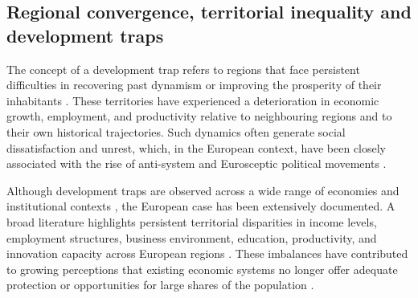 \documentclass[a4paper,11pt,oneside]{article}
\begin{document}
\subsection{Regional convergence, territorial inequality and development traps}


The concept of a development trap refers to regions that face persistent difficulties in recovering past dynamism or improving the prosperity of their inhabitants \citep{diemer2022regional}. These territories have experienced a deterioration in economic growth, employment, and productivity relative to neighbouring regions and to their own historical trajectories. Such dynamics often generate social dissatisfaction and unrest, which, in the European context, have been closely associated with the rise of anti-system and Eurosceptic political movements \citep{dijkstra2020geography}.




Although development traps are observed across a wide range of economies and institutional contexts \citep{azariadis2005poverty,rodrik2016premature}, the European case has been extensively documented. A broad literature highlights persistent territorial disparities in income levels, employment structures, business environment, education, productivity, and innovation capacity across European regions \citep{iammarino2019regional,rodriguez2023left}. These imbalances have contributed to growing perceptions that existing economic systems no longer offer adequate protection or opportunities for large shares of the population \citep{bonikowski2017ethno,rodrik2017populism}.




\end{document}
